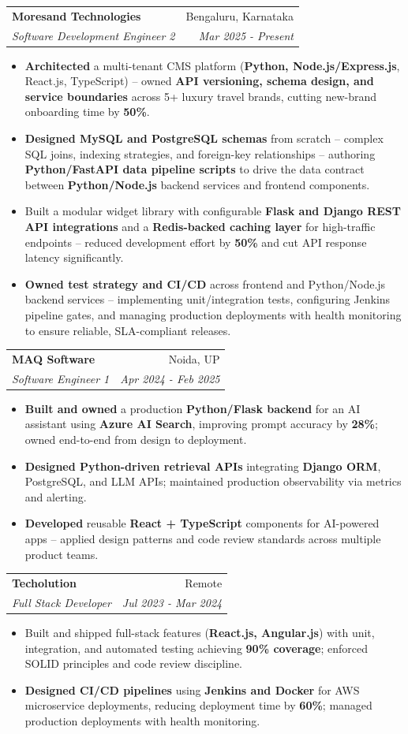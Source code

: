 \documentclass[a4paper,20pt]{article}
\makeatletter
\newcommand{\resumeSubheading}[4]{\vspace{-1pt}\item\begin{tabular*}{0.97\textwidth}{l@{\extracolsep{\fill}}r}\textbf{#1} & #2 \\\textit{#3} & \textit{#4} \\\end{tabular*}\vspace{-5pt}}
\newcommand{\resumeItemListStart}{\begin{itemize}}
\newcommand{\resumeItemListEnd}{\end{itemize}\vspace{-5pt}}
\makeatother
\begin{document}
   \resumeSubheading{Moresand Technologies}{Bengaluru, Karnataka}
      {Software Development Engineer 2}{Mar 2025 - Present}
      \resumeItemListStart
 \item\small{\textbf{Architected} a multi-tenant CMS platform (\textbf{Python, Node.js/Express.js}, React.js, TypeScript) -- owned \textbf{API versioning, schema design, and service boundaries} across 5+ luxury travel brands, cutting new-brand onboarding time by \textbf{50\%}.}
    \item\small{\textbf{Designed MySQL and PostgreSQL schemas} from scratch -- complex SQL joins, indexing strategies, and foreign-key relationships -- authoring \textbf{Python/FastAPI data pipeline scripts} to drive the data contract between \textbf{Python/Node.js} backend services and frontend components.}
    \item\small{Built a modular widget library with configurable \textbf{Flask and Django REST API integrations} and a \textbf{Redis-backed caching layer} for high-traffic endpoints -- reduced development effort by \textbf{50\%} and cut API response latency significantly.}
    \item\small{\textbf{Owned test strategy and CI/CD} across frontend and Python/Node.js backend services -- implementing unit/integration tests, configuring Jenkins pipeline gates, and managing production deployments with health monitoring to ensure reliable, SLA-compliant releases.}
\resumeItemListEnd

\resumeSubheading{MAQ Software}{Noida, UP}
      {Software Engineer 1}{Apr 2024 - Feb 2025}
      \resumeItemListStart
\item\small{\textbf{Built and owned} a production \textbf{Python/Flask backend} for an AI assistant using \textbf{Azure AI Search}, improving prompt accuracy by \textbf{28\%}; owned end-to-end from design to deployment.}
\item\small{\textbf{Designed Python-driven retrieval APIs} integrating \textbf{Django ORM}, PostgreSQL, and LLM APIs; maintained production observability via metrics and alerting.}
\item\small{\textbf{Developed} reusable \textbf{React + TypeScript} components for AI-powered apps -- applied design patterns and code review standards across multiple product teams.}
\resumeItemListEnd

    \resumeSubheading{Techolution}{Remote}
      {Full Stack Developer}{Jul 2023 - Mar 2024}
      \resumeItemListStart
     \item\small{Built and shipped full-stack features (\textbf{React.js, Angular.js}) with unit, integration, and automated testing achieving \textbf{90\% coverage}; enforced SOLID principles and code review discipline.}
\item\small{\textbf{Designed CI/CD pipelines} using \textbf{Jenkins and Docker} for AWS microservice deployments, reducing deployment time by \textbf{60\%}; managed production deployments with health monitoring.}
      \resumeItemListEnd
\end{document}
